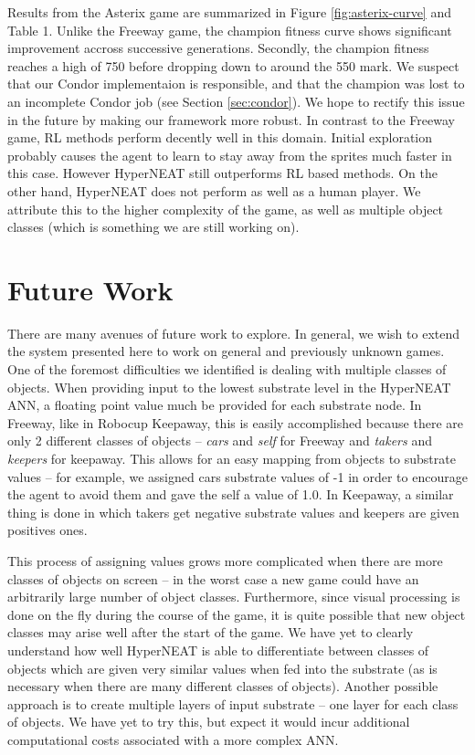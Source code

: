 \documentclass{acm_proc_article-sp}
\begin{document}
Results from the Asterix game are summarized in Figure \ref{fig:asterix-curve} and Table 1. Unlike the Freeway game, the champion fitness curve shows significant improvement accross successive generations. Secondly, the champion fitness reaches a high of 750 before dropping down to around the 550 mark. We suspect that our Condor implementaion is responsible, and that the champion was lost to an incomplete Condor job (see Section \ref{sec:condor}). We hope to rectify this issue in the future by making our framework more robust. In contrast to the Freeway game, RL methods perform decently well in this domain. Initial exploration probably causes the agent to learn to stay away from the sprites much faster in this case. However HyperNEAT still outperforms RL based methods. On the other hand, HyperNEAT does not perform as well as a human player. We attribute this to the higher complexity of the game, as well as multiple object classes (which is something we are still working on). 

\section{Future Work}
\label{sec:futurework}
There are many avenues of future work to explore. In general, we wish to extend the system presented here to work on general and previously unknown games. One of the foremost difficulties we identified is dealing with multiple classes of objects. When providing input to the lowest substrate level in the HyperNEAT ANN, a floating point value much be provided for each substrate node. In Freeway, like in Robocup Keepaway, this is easily accomplished because there are only 2 different classes of objects -- \textit{cars} and \textit{self} for Freeway and \textit{takers} and \textit{keepers} for keepaway. This allows for an easy mapping from objects to substrate values -- for example, we assigned cars substrate values of -1 in order to encourage the agent to avoid them and gave the self a value of 1.0. In Keepaway, a similar thing is done in which takers get negative substrate values and keepers are given positives ones. 

This process of assigning values grows more complicated when there are more classes of objects on screen -- in the worst case a new game could have an arbitrarily large number of object classes. Furthermore, since visual processing is done on the fly during the course of the game, it is quite possible that new object classes may arise well after the start of the game. We have yet to clearly understand how well HyperNEAT is able to differentiate between classes of objects which are given very similar values when fed into the substrate (as is necessary when there are many different classes of objects). Another possible approach is to create multiple layers of input substrate -- one layer for each class of objects. We have yet to try this, but expect it would incur additional computational costs associated with a more complex ANN.
\end{document}
